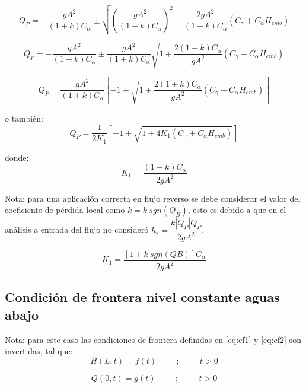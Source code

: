 \documentclass[letterpaper]{report}
\begin{document}
\begin{equation*}
	Q_P=-\frac{gA^2}{\left(1+k\right)C_\alpha}\pm\sqrt{\left(\frac{gA^2}{\left(1+k\right)C_\alpha}\right)^2+\frac{2gA^2}{\left(1+k\right)C_\alpha}\left(C_\gamma+C_\alpha H_{emb}\right)}
\end{equation*}

\begin{equation*}
	Q_P=-\frac{gA^2}{\left(1+k\right)C_\alpha}\pm\frac{gA^2}{\left(1+k\right)C_\alpha}\sqrt{1+\frac{2\left(1+k\right)C_\alpha}{gA^2}\left(C_\gamma+C_\alpha H_{emb}\right)}
\end{equation*}

\begin{equation*}
	Q_P=\frac{gA^2}{\left(1+k\right)C_\alpha}\left[-1\pm\sqrt{1+\frac{2\left(1+k\right)C_\alpha}{gA^2}\left(C_\gamma+C_\alpha H_{emb}\right)}\right]
\end{equation*}

o también:
\begin{equation}
	Q_P=\frac{1}{{2K}_1}\left[-1\pm\sqrt{1+{4K}_1\left(C_\gamma+C_\alpha H_{emb}\right)}\right]
\end{equation}

donde:
\begin{equation}
	K_1=\dfrac{\left(1+k\right)C_\alpha}{2gA^2}
\end{equation}

Nota: para una aplicación correcta en flujo reverso se debe considerar el valor del coeficiente de pérdida local como $k=k\ sgn(Q_B)$, esto es debido a que en el análisis a entrada del flujo no consideró $h_e=\dfrac{k\left|Q_P\right|Q_P}{2gA^2}$.

\begin{equation}
	K_1=\dfrac{[1+k \ sgn(QB)]C_\alpha}{2gA^2}
\end{equation}

\subsection{Condición de frontera nivel constante aguas abajo}
Nota: para este caso las condiciones de frontera definidas en \ref{eq:cf1} y \ref{eq:cf2} son invertidas, tal que:
\begin{equation}
	H(L,t)=f(t) \hspace{1cm} ; \hspace{1cm} t>0
	\label{eq:cf3}
\end{equation}

\begin{equation}
	Q(0,t)=g(t) \hspace{1cm} ; \hspace{1cm} t>0
	\label{eq:cf4}
\end{equation}
\end{document}

